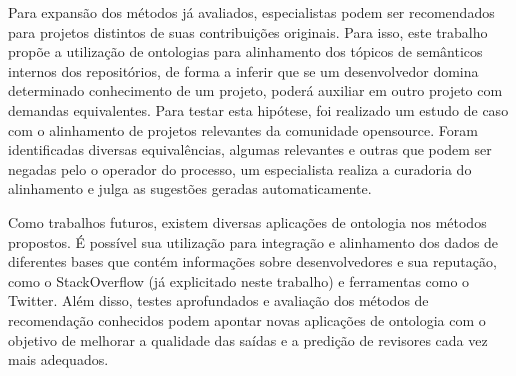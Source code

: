 \documentclass[sigconf]{acmart}
\begin{document}
Para expansão dos métodos já avaliados, especialistas podem ser recomendados para projetos distintos de suas contribuições originais. Para isso, este trabalho propõe a utilização de ontologias para alinhamento dos tópicos de semânticos internos dos repositórios, de forma a inferir que se um desenvolvedor domina determinado conhecimento de um projeto, poderá auxiliar em outro projeto com demandas equivalentes. Para testar esta hipótese, foi realizado um estudo de caso com o alinhamento de projetos relevantes da comunidade opensource. Foram identificadas diversas equivalências, algumas relevantes e outras que podem ser negadas pelo o operador do processo, um especialista realiza a curadoria do alinhamento e julga as sugestões geradas automaticamente.

Como trabalhos futuros, existem diversas aplicações de ontologia nos métodos propostos. É possível sua utilização para integração e alinhamento dos dados de diferentes bases que contém informações sobre desenvolvedores e sua reputação, como o StackOverflow (já explicitado neste trabalho) e ferramentas como o Twitter. Além disso, testes aprofundados e avaliação dos métodos de recomendação conhecidos podem apontar novas aplicações de ontologia com o objetivo de melhorar a qualidade das saídas e a predição de revisores cada vez mais adequados.



\end{document}
